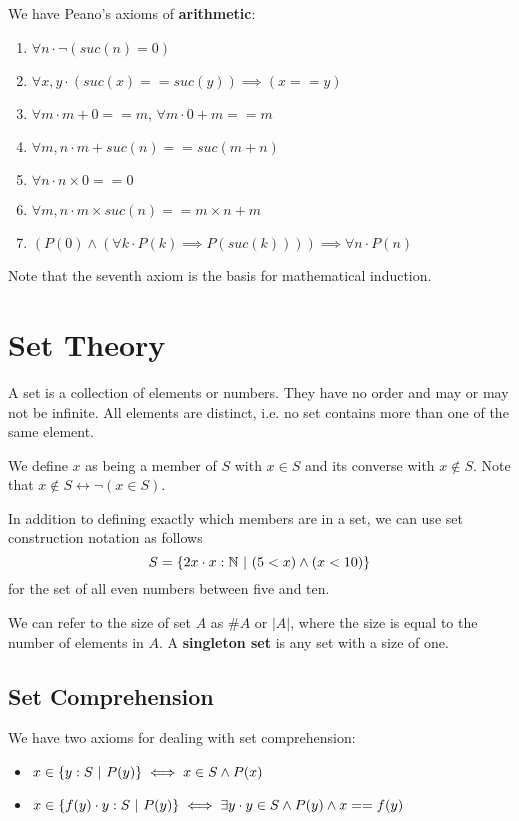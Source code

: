 \documentclass[12pt]{article}
\begin{document}
We have Peano's axioms of {\bf arithmetic}:
\begin{enumerate}
\item $\forall n \cdot \neg (suc(n) = 0)$
\item $\forall x, y \cdot (suc(x) == suc(y)) \implies (x == y)$
\item $\forall m \cdot m + 0 == m$, $\forall m \cdot 0 + m == m$
\item $\forall m,n \cdot m + suc(n) == suc(m + n)$
\item $\forall n \cdot n \times 0 == 0$
\item $\forall m,n \cdot m \times suc(n) == m \times n + m$
\item $(P(0) \land (\forall k \cdot P(k) \implies P(suc(k)))) \implies \forall n \cdot P(n)$
\end{enumerate}

Note that the seventh axiom is the basis for mathematical induction.

\section*{Set Theory}
A set is a collection of elements or numbers. They have no order and may or may not be infinite. All elements are distinct, i.e. no set contains more than one of the same element.

We define $x$ as being a member of $S$ with $x \in S$ and its converse with $x \not\in S$. Note that $x \not\in S \leftrightarrow \neg(x \in S)$.

In addition to defining exactly which members are in a set, we can use set construction notation as follows \[ S = \{ 2x \cdot x : \mathbb{N} \ |\  (5 < x) \land (x < 10) \} \] for the set of all even numbers between five and ten.

We can refer to the size of set $A$ as $\#A$ or $|A|$, where the size is equal to the number of elements in $A$. A {\bf singleton set} is any set with a size of one.

\subsection*{Set Comprehension}
We have two axioms for dealing with set comprehension:
\begin{itemize}
\item $x \in \{ y : S \ |\  P(y) \} \iff x \in S \land P(x)$
\item $x \in \{ f(y) \cdot y : S \ |\  P(y) \} \iff \exists y \cdot y \in S \land P(y) \land x == f(y)$
\end{itemize}
\end{document}
